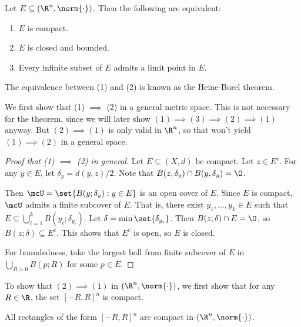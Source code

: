 \begin{theorem*} \label{thm:compactness}
    Let $E \subseteq (\R^n, \norm{\cdot})$.
    Then the following are equivalent:
    \begin{enumerate}[label=(\arabic*)]
        \item $E$ is compact.
        \item $E$ is closed and bounded.
        \item Every infinite subset of $E$ admits a limit point in $E$.
    \end{enumerate}
\end{theorem*}
\begin{remark}
    The equivalence between (1) and (2) is known as the Heine-Borel theorem.
\end{remark}
We first show that (1) $\implies$ (2) in a general metric space.
This is not necessary for the theorem, since we will later show
$(1) \implies (3) \implies (2) \implies (1)$ anyway.
But $(2) \implies (1)$ is only valid in $\R^n$, so that won't yield
$(1) \implies (2)$ in a general space.
\begin{proof}[Proof that (1) $\implies$ (2) in general]
    Let $E \subseteq (X, d)$ be compact.
    Let $z \in E^c$.
    For any $y \in E$, let $\delta_y = d(y, z) / 2$.
    Note that $B(z, \delta_y) \cap B(y, \delta_y) = \O$.

    Then $\mcU = \set{B(y; \delta_y) : y \in E}$ is an open cover of $E$.
    Since $E$ is compact, $\mcU$ admits a finite subcover of $E$.
    That is, there exist $y_1, \dots, y_k \in E$ such that
    $E \subseteq \bigcup_{i = 1}^k B(y_i; \delta_{y_i})$.
    Let $\delta = \min\set{\delta_{y_i}}$.
    Then $B(z; \delta) \cap E = \O$, so $B(z; \delta) \subseteq E^c$.
    This shows that $E^c$ is open, so $E$ is closed.

    For boundedness, take the largest ball from finite subcover of
    $E$ in $\bigcup_{R > 0} B(p; R)$ for some $p \in E$.
\end{proof}
To show that $(2) \implies (1)$ in $(\R^n, \norm{\cdot})$,
we first show that for any $R \in \R$, the set $[-R, R]^n$ is compact.
\begin{theorem}
    All rectangles of the form $[-R, R]^n$ are compact in
    $(\R^n, \norm{\cdot})$.
\end{theorem}

